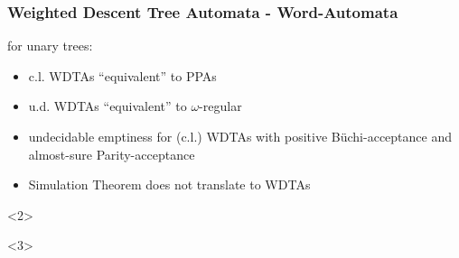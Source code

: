 \documentclass{beamer}
\begin{document}
  \begin{frame}
    \frametitle{Weighted Descent Tree Automata - Word-Automata}
    for unary trees:
    \begin{itemize}
      \item<2-> c.l. \acp{WDTA} \enquote{equivalent} to \acp{PPA}
      \item<3-> u.d. \acp{WDTA} \enquote{equivalent} to $\omega$-regular
      \item[$\Rightarrow$]<4-> undecidable emptiness for (c.l.) \acp{WDTA}
        with positive Büchi-acceptance and almost-sure Parity-acceptance
      \item[$\Rightarrow$]<5-> Simulation Theorem does not translate to
        \acp{WDTA}
    \end{itemize}
    \begin{overlayarea}{\textwidth}{0.5\textheight}
      \begin{center}
        \begin{onlyenv}<2>
        \end{onlyenv}
        \begin{onlyenv}<3>
        \end{onlyenv}
      \end{center}
    \end{overlayarea}
  \end{frame}
\end{document}
